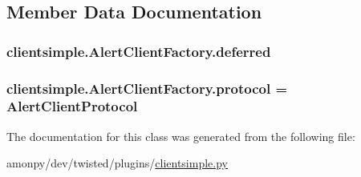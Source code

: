 \subsection{Member Data Documentation}
\hypertarget{classclientsimple_1_1_alert_client_factory_a944edc2575a1528d6b5c3b7bfe07906b}{
\subsubsection[{deferred}]{\setlength{\rightskip}{0pt plus 5cm}clientsimple.\-Alert\-Client\-Factory.\-deferred}}\label{classclientsimple_1_1_alert_client_factory_a944edc2575a1528d6b5c3b7bfe07906b}
\hypertarget{classclientsimple_1_1_alert_client_factory_a8407b6a35b081ae3536cfac79015e780}{
\subsubsection[{protocol}]{\setlength{\rightskip}{0pt plus 5cm}clientsimple.\-Alert\-Client\-Factory.\-protocol = {\bf Alert\-Client\-Protocol}\hspace{0.3cm}{\ttfamily [static]}}}\label{classclientsimple_1_1_alert_client_factory_a8407b6a35b081ae3536cfac79015e780}


The documentation for this class was generated from the following file\-:\begin{DoxyCompactItemize}
\item 
amonpy/dev/twisted/plugins/\hyperlink{clientsimple_8py}{clientsimple.\-py}\end{DoxyCompactItemize}
